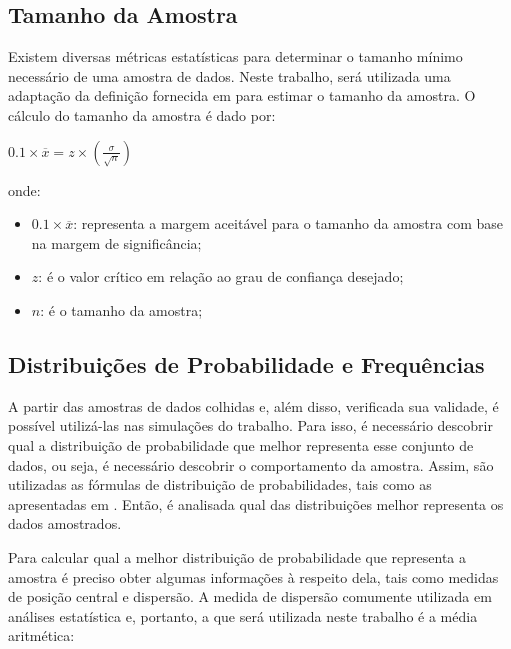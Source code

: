 \documentclass[pt,disc,oneside]{ufscpgeasthesis}
\begin{document}
			\subsection{Tamanho da Amostra}
			\label{subsec:tamanho}

				Existem diversas métricas estatísticas para determinar o tamanho mínimo necessário de uma amostra de dados.
				Neste trabalho, será utilizada uma adaptação da definição fornecida em \cite{Distribuicoes} para estimar o tamanho da amostra.
				O cálculo do tamanho da amostra é dado por:

				\begin{center}
					\LARGE{$ 0.1 \times \overline{x} = z \times (\frac{\sigma}{\sqrt{n}})$}
				\end{center}

				onde:

				\begin{itemize}
					\item{\large\textbf{$0.1 \times \overline{x}$}:} representa a margem aceitável para o tamanho da amostra com base na margem de significância;
					\item{\large\textbf{$z$}:} é o valor crítico em relação ao grau de confiança desejado;
					\item{\large\textbf{$n$}:} é o tamanho da amostra;
				\end{itemize}

			\subsection{Distribuições de Probabilidade e Frequências}
			\label{subsec:distribuicao}

				A partir das amostras de dados colhidas e, além disso, verificada sua validade, é possível utilizá-las nas simulações do trabalho.
				Para isso, é necessário descobrir qual a distribuição de probabilidade que melhor representa esse conjunto de dados, ou seja, é necessário descobrir o comportamento da amostra.
				Assim, são utilizadas as fórmulas de distribuição de probabilidades, tais como as apresentadas em \cite{Distribuicoes}.
				Então, é analisada qual das distribuições melhor representa os dados amostrados.

				Para calcular qual a melhor distribuição de probabilidade que representa a amostra é preciso obter algumas informações à respeito dela, tais como medidas de posição central e dispersão.
				A medida de dispersão comumente utilizada em análises estatística e, portanto, a que será utilizada neste trabalho é a média aritmética:
\end{document}
